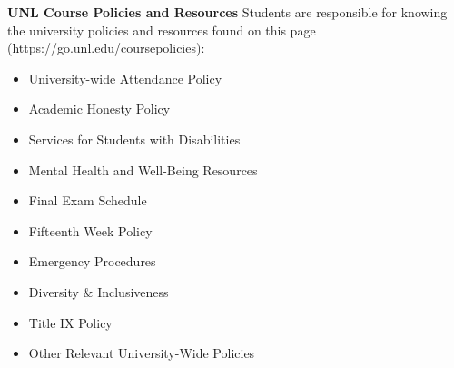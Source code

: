 \documentclass{amsart}
\begin{document}
\bigskip
\noindent
\textbf{UNL Course Policies and Resources}
Students are responsible for knowing the university policies and resources found on this page (https://go.unl.edu/coursepolicies):
 \begin{multicols}{2}
 \begin{itemize}
\item University-wide Attendance Policy
\item Academic Honesty Policy
\item Services for Students with Disabilities
\item Mental Health and Well-Being Resources
\item Final Exam Schedule 
\item Fifteenth Week Policy 
\item Emergency Procedures 
\item Diversity \& Inclusiveness 
\item Title IX Policy 
\item Other Relevant University-Wide Policies
\end{itemize} 
\end{multicols}

\vfill
\pagebreak
\smallskip
%
\end{document}
